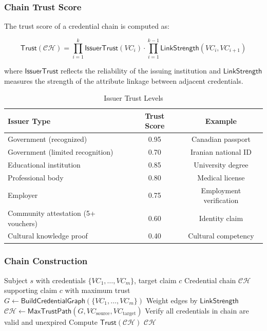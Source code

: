 \documentclass[11pt,a4paper]{article}
\begin{document}
\subsubsection{Chain Trust Score}

The trust score of a credential chain is computed as:

\begin{equation}
    \mathsf{Trust}(\mathcal{CH}) = \prod_{i=1}^{k} \mathsf{IssuerTrust}(VC_i) \cdot \prod_{i=1}^{k-1} \mathsf{LinkStrength}(VC_i, VC_{i+1})
\end{equation}

where $\mathsf{IssuerTrust}$ reflects the reliability of the issuing institution and $\mathsf{LinkStrength}$ measures the strength of the attribute linkage between adjacent credentials.

\begin{table}[H]
\centering
\caption{Issuer Trust Levels}
\label{tab:issuer-trust}
\begin{tabular}{lcc}
\toprule
\textbf{Issuer Type} & \textbf{Trust Score} & \textbf{Example} \\
\midrule
Government (recognized) & 0.95 & Canadian passport \\
Government (limited recognition) & 0.70 & Iranian national ID \\
Educational institution & 0.85 & University degree \\
Professional body & 0.80 & Medical license \\
Employer & 0.75 & Employment verification \\
Community attestation (5+ vouchers) & 0.60 & Identity claim \\
Cultural knowledge proof & 0.40 & Cultural competency \\
\bottomrule
\end{tabular}
\end{table}

\subsubsection{Chain Construction}

\begin{algorithm}[H]
\caption{Credential Chain Construction}
\label{alg:chain}
\begin{algorithmic}[1]
\Require Subject $s$ with credentials $\{VC_1, \ldots, VC_m\}$, target claim $c$
\Ensure Credential chain $\mathcal{CH}$ supporting claim $c$ with maximum trust
\State $G \leftarrow \mathsf{BuildCredentialGraph}(\{VC_1, \ldots, VC_m\})$
\State Weight edges by $\mathsf{LinkStrength}$
\State $\mathcal{CH} \leftarrow \mathsf{MaxTrustPath}(G, VC_{\text{source}}, VC_{\text{target}})$
\State Verify all credentials in chain are valid and unexpired
\State Compute $\mathsf{Trust}(\mathcal{CH})$
\State \Return $\mathcal{CH}$
\end{algorithmic}
\end{algorithm}
\end{document}
